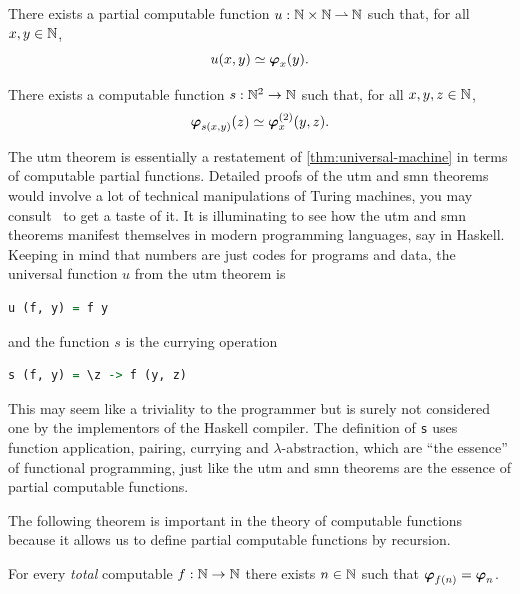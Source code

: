 \begin{theorem}[utm]
  There exists a partial computable function $u : \mathbb{N} \times
  \mathbb{N} \mathbin{\rightharpoonup} \mathbb{N}$ such that, for all $x, y \in \mathbb{N}$,
  \begin{equation*}
    u(x,y) \simeq \text{\boldmath{$\varphi$}}_{x}(y).
  \end{equation*}
\end{theorem}

\begin{theorem}[smn]
  There exists a computable function $s :
  \mathbb{N}^2 \to \mathbb{N}$ such that, for all $x, y, z \in \mathbb{N}$,
  \begin{equation*}
    \text{\boldmath{$\varphi$}}_{s(x, y)}(z) \simeq \text{\boldmath{$\varphi$}}^{(2)}_{x}(y,z).
  \end{equation*}
\end{theorem}

\noindent
The utm theorem is essentially a restatement of
\cref{thm:universal-machine} in terms of computable partial
functions. Detailed proofs of the utm and smn theorems would involve
a lot of technical manipulations of Turing machines, you may consult~ to get a taste of it.
It is illuminating to see how the utm and smn theorems manifest themselves in modern programming languages, say in Haskell. Keeping in mind that numbers are just codes for programs and data, the universal function $u$ from the utm theorem is
%
\begin{lstlisting}[language=Haskell]
u (f, y) = f y
\end{lstlisting}
%
and the function $s$ is the currying operation
%
\begin{lstlisting}[language=Haskell]
s (f, y) = \z -> f (y, z)
\end{lstlisting}
%
This may seem like a triviality to the programmer but is surely not
considered one by the implementors of the Haskell compiler. The definition of \lstinline!s! uses function application, pairing, currying and $\lambda$-abstraction, which are ``the essence'' of functional programming, just like the utm and smn theorems are the essence of partial computable functions.

The following theorem is important in the theory of computable
functions because it allows us to define partial computable functions
by recursion.

\begin{theorem}
  For every \emph{total} computable $f : \mathbb{N} \to \mathbb{N}$ there exists $n
  \in \mathbb{N}$ such that $\text{\boldmath{$\varphi$}}_{f(n)} = \text{\boldmath{$\varphi$}}_{n}$.
\end{theorem}

